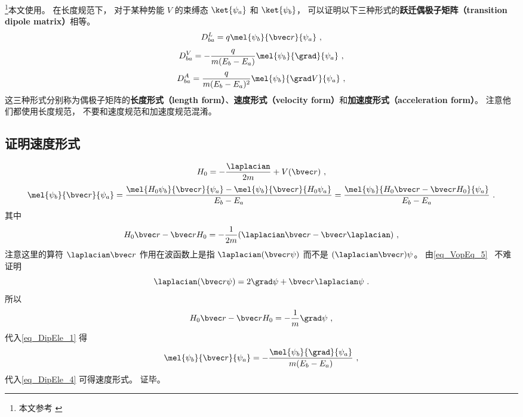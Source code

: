 

\footnote{本文参考 \cite{Bransden}}本文使用。 在长度规范下， 对于某种势能 $V$ 的束缚态 $\ket{\psi_a}$ 和 $\ket{\psi_b}$， 可以证明以下三种形式的\textbf{跃迁偶极子矩阵（transition dipole matrix）}相等。
\begin{equation}\label{eq_DipEle_4}
D_{ba}^L = q\mel{\psi_b}{\bvec r}{\psi_a}~,
\end{equation}
\begin{equation}\label{eq_DipEle_3}
D_{ba}^V = -\frac{q}{m(E_b - E_a)}\mel{\psi_b}{\grad}{\psi_a}~,
\end{equation}
\begin{equation}
D_{ba}^A = \frac{q}{m(E_b-E_a)^2} \mel{\psi_b}{\grad V}{\psi_a}~,
\end{equation}
这三种形式分别称为偶极子矩阵的\textbf{长度形式（length form）}、\textbf{速度形式（velocity form）}和\textbf{加速度形式（acceleration form）}。 注意他们都使用长度规范， 不要和速度规范和加速度规范混淆。 %

\subsection{证明速度形式}
\begin{equation}
H_0 = -\frac{\laplacian}{2m} + V(\bvec r)~,
\end{equation}
\begin{equation}\label{eq_DipEle_1}
\mel{\psi_b}{\bvec r}{\psi_a} = \frac{\mel{H_0\psi_b}{\bvec r}{\psi_a} - \mel{\psi_b}{\bvec r}{H_0\psi_a}}{E_b - E_a} = \frac{\mel{\psi_b}{H_0\bvec r - \bvec rH_0}{\psi_a}}{E_b - E_a}~.
\end{equation}
其中
\begin{equation}
H_0\bvec r - \bvec rH_0 = -\frac{1}{2m}(\laplacian \bvec r - \bvec r \laplacian)~,
\end{equation}
注意这里的算符 $\laplacian \bvec r$ 作用在波函数上是指 $\laplacian (\bvec r \psi)$ 而不是 $(\laplacian \bvec r) \psi$。 由\autoref{eq_VopEq_5}~ 不难证明
\begin{equation}
\laplacian (\bvec r \psi) = 2 \grad \psi + \bvec r \laplacian \psi~.
\end{equation}
所以
\begin{equation}
H_0\bvec r - \bvec rH_0 = -\frac{1}{m}\grad \psi~,
\end{equation}
代入\autoref{eq_DipEle_1} 得
\begin{equation}
\mel{\psi_b}{\bvec r}{\psi_a} = -\frac{\mel{\psi_b}{\grad}{\psi_a}}{m(E_b - E_a)}~,
\end{equation}
代入\autoref{eq_DipEle_4} 可得速度形式。 证毕。


